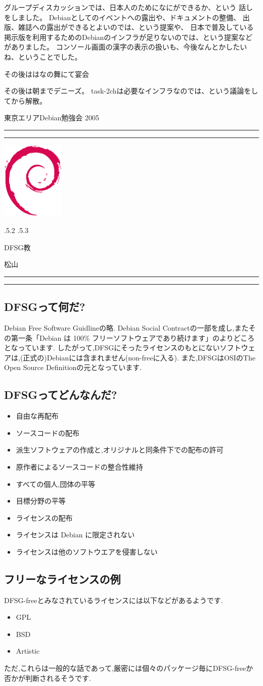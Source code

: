\documentclass[mingoth]{jsarticle}
\makeatletter
\renewcommand{\section}{\@startsection{section}{1}{\z@}%
    {\Cvs \@plus.5\Cdp \@minus.2\Cdp}%
    {.5\Cvs \@plus.3\Cdp}%
    {\normalfont\Large\headfont\raggedright\centering}} %
\newcommand{\dancersection}[2]{%
\newpage
東京エリアDebian勉強会 2005
\hrule
\vspace{0.5mm}
\hrule
\hfill{}\includegraphics[width=3cm]{image200502/openlogo-nd.eps}\\
\vspace{-4cm}
\begin{center}
  \section{#1}
\end{center}
\hfill{}#2\hspace{3cm}\space\\
\hrule
\hrule
\vspace{1cm}
}
\makeatother
\begin{document}
	    グループディスカッションでは、日本人のためになにができるか、という
	    話しをしました。
	    Debianとしてのイベントへの露出や、ドキュメントの整備、
	    出版、雑誌への露出ができるとよいのでは、という提案や、
	    日本で普及している掲示版を利用するためのDebianのインフラが足りないのでは、という提案などがありました。
	    コンソール画面の漢字の表示の扱いも、今後なんとかしたいね、ということでした。


	    その後ははなの舞にて宴会

	    その後は朝までデニーズ。
	    task-2chは必要なインフラなのでは、という議論をしてから解散。

\dancersection{DFSG教}{松山}
\subsection{DFSGって何だ?}
Debian Free Software Guidlineの略.
Debian Social Contractの一部を成し,またその第一条「Debian は 100\% フリーソフトウェアであり続けます」のよりどころとなっています.
したがって,DFSGにそったライセンスのもとにないソフトウェアは,(正式の)Debianには含まれません(non-freeに入る).
また,DFSGはOSIのThe Open Source Definitionの元となっています.
\subsection{DFSGってどんなんだ?}
\begin{itemize}
\item 自由な再配布
\item ソースコードの配布
\item 派生ソフトウェアの作成と,オリジナルと同条件下での配布の許可
\item 原作者によるソースコードの整合性維持
\item すべての個人,団体の平等
\item 目標分野の平等
\item ライセンスの配布
\item ライセンスは Debian に限定されない
\item ライセンスは他のソフトウエアを侵害しない
\end{itemize}

\subsection{フリーなライセンスの例}
DFSG-freeとみなされているライセンスには以下などがあるようです.
\begin{itemize}
\item GPL
\item BSD
\item Artistic
\end{itemize}
ただ,これらは一般的な話であって,厳密には個々のパッケージ毎にDFSG-freeか否かが判断されるそうです.
\end{document}
